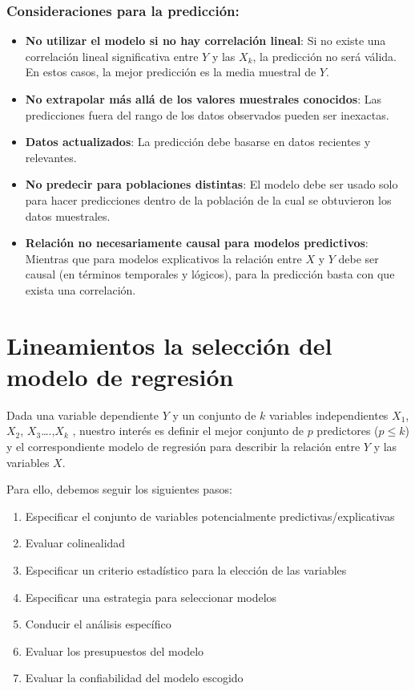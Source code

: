\documentclass[
  spanish,
  a4paper,
]{scrbook}
\providecommand{\tightlist}{%
  \setlength{\itemsep}{0pt}\setlength{\parskip}{0pt}}
\begin{document}
\subsubsection{Consideraciones para la
predicción:}\label{consideraciones-para-la-predicciuxf3n}

\begin{itemize}
\item
  \textbf{No utilizar el modelo si no hay correlación lineal}: Si no
  existe una correlación lineal significativa entre \(Y\) y las \(X_k\),
  la predicción no será válida. En estos casos, la mejor predicción es
  la media muestral de \(Y\).
\item
  \textbf{No extrapolar más allá de los valores muestrales conocidos}:
  Las predicciones fuera del rango de los datos observados pueden ser
  inexactas.
\item
  \textbf{Datos actualizados}: La predicción debe basarse en datos
  recientes y relevantes.
\item
  \textbf{No predecir para poblaciones distintas}: El modelo debe ser
  usado solo para hacer predicciones dentro de la población de la cual
  se obtuvieron los datos muestrales.
\item
  \textbf{Relación no necesariamente causal para modelos predictivos}:
  Mientras que para modelos explicativos la relación entre \(X\) y \(Y\)
  debe ser causal (en términos temporales y lógicos), para la predicción
  basta con que exista una correlación.
\end{itemize}

\section{Lineamientos la selección del modelo de
regresión}\label{lineamientos-la-selecciuxf3n-del-modelo-de-regresiuxf3n}

Dada una variable dependiente \(Y\) y un conjunto de \(k\) variables
independientes \(X_1\), \(X_2\), \(X_3\)\ldots.,\(X_k\) , nuestro
interés es definir el mejor conjunto de \(p\) predictores (\(p \leq k\))
y el correspondiente modelo de regresión para describir la relación
entre \(Y\) y las variables \(X\).

Para ello, debemos seguir los siguientes pasos:

\begin{enumerate}
\def\labelenumi{\arabic{enumi}.}
\tightlist
\item
  Especificar el conjunto de variables potencialmente
  predictivas/explicativas
\item
  Evaluar colinealidad
\item
  Especificar un criterio estadístico para la elección de las variables
\item
  Especificar una estrategia para seleccionar modelos
\item
  Conducir el análisis específico
\item
  Evaluar los presupuestos del modelo
\item
  Evaluar la confiabilidad del modelo escogido
\end{enumerate}
\end{document}
